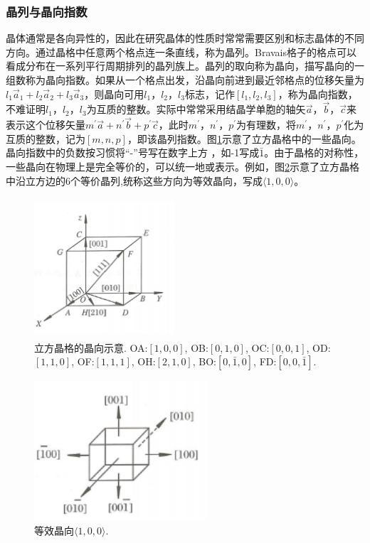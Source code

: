 \subsubsection{晶列与晶向指数} 
晶体通常是各向异性的，因此在研究晶体的性质时常常需要区别和标志晶体的不同方向。通过晶格中任意两个格点连一条直线，称为晶列。Bravais格子的格点可以看成分布在一系列平行周期排列的晶列族上。晶列的取向称为晶向，描写晶向的一组数称为晶向指数。如果从一个格点出发，沿晶向前进到最近邻格点的位移矢量为$l_1\vec a_1+l_2\vec a_2+l_3\vec a_3$，则晶向可用$l_1$，$l_2$，$l_3$标志，记作$[l_1,l_2,l_3]$，称为晶向指数，不难证明$l_1$，$l_2$，$l_3$为互质的整数。实际中常常采用结晶学单胞的轴矢$\vec a$，$\vec b$，$\vec c$来表示这个位移矢量$m^{\prime}\vec a+n^{\prime}\vec b+p^{\prime}\vec c$，此时$m^{\prime}$，$n^{\prime}$，$p^{\prime}$为有理数，将$m^{\prime}$，$n^{\prime}$，$p^{\prime}$化为互质的整数，记为$[m,n,p]$，即该晶列指数。图\ref{Fig:Crystal_orientation}示意了立方晶格中的一些晶向。晶向指数中的负数按习惯将``-''号写在数字上方 ，如-1写成$\bar{1}$。由于晶格的对称性，一些晶向在物理上是完全等价的，可以统一地或表示。例如，图\ref{Fig:Cubic_orientation}示意了立方晶格中沿立方边的6个等价晶列,统称这些方向为等效晶向，写成$\langle1,0,0\rangle$。
\begin{figure}[h!]
\centering
\vspace*{-0.05in}
\includegraphics[height=2.05in,width=2.05in,viewport=0 0 45 45,clip]{Figures/Crystal_orientation.png}
\caption{\small \textrm{立方晶格的晶向示意. OA:$[1,0,0]$, OB:$[0,1,0]$, OC:$[0,0,1]$, OD:$[1,1,0]$, OF:$[1,1,1]$, OH:$[2,1,0]$, BO:$[0,\bar{1},0]$, FD:$[0,0,\bar{1}]$.}}%
\label{Fig:Crystal_orientation}
\end{figure}

\begin{figure}[h!]
\centering
\vspace*{-0.05in}
\includegraphics[height=2.05in,width=2.55in,viewport=0 0 45 33,clip]{Figures/Cubic_equal-orientation.png}
\caption{\small \textrm{等效晶向$\langle1,0,0\rangle$.}}%
\label{Fig:Cubic_orientation}
\end{figure}

